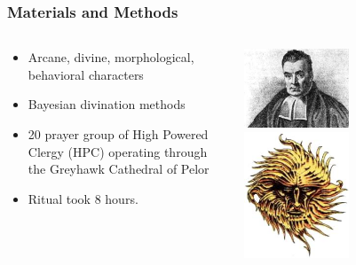 \documentclass{beamer}\usepackage{graphicx, color}
\begin{document}
\begin{frame}
  \frametitle{Materials and Methods}

  \begin{columns}
    \begin{column}{0.5\textwidth}
      \begin{itemize}
        \item Arcane, divine, morphological, behavioral characters
        \item Bayesian divination methods
        \item 20 prayer group of High Powered Clergy (HPC) operating through the Greyhawk Cathedral of Pelor
        \item Ritual took 8 hours.
      \end{itemize}
    \end{column}

    \begin{column}{0.5\textwidth}
      \begin{center}
        \includegraphics[width = 0.5\textwidth, keepaspectratio = true]{bayes}
        \includegraphics[width = 0.5\textwidth, keepaspectratio = true]{pelor}
      \end{center}

    \end{column}

  \end{columns}

\end{frame}
\end{document}
